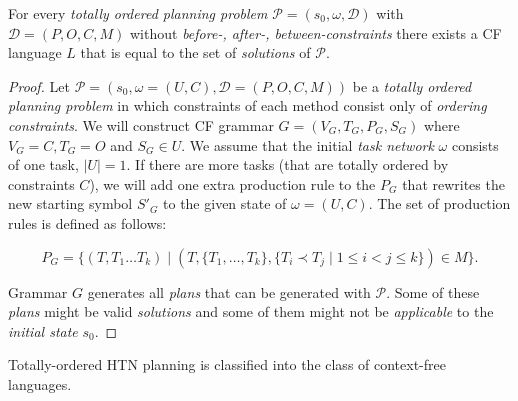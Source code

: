 \begin{thm}\label{thm02:4}
    For every \emph{totally ordered planning problem} $\mathcal{P} = (s_0,\omega,\mathcal{D})$ with $\mathcal{D}=(P, O, C, M)$ without \emph{before-, after-, between-constraints} there exists a CF language $L$ that is equal to the set of \emph{solutions} of $\mathcal{P}$.
\end{thm}
\begin{proof}
    Let $\mathcal{P} = (s_0,\omega = (U, C), \mathcal{D} = (P, O, C, M))$ be a \emph{totally ordered planning problem} in which constraints of each method consist only of \emph{ordering constraints}. We will construct CF grammar $G = (V_G, T_G, P_G, S_G)$ where $V_G = C, T_G = O$ and $S_G \in U$. We assume that the initial \emph{task network} $\omega$ consists of one task, $|U| = 1$. If there are more tasks (that are totally ordered by constraints $C$), we will add one extra production rule to the $P_G$ that rewrites the new starting symbol $S'_G$ to the given state of $\omega = (U, C)$. The set of production rules is defined as follows:
    
    \[
    P_G = \{(T, T_1\dots T_k) \; | \; (T, \{T_1, \dots, T_k\}, \{T_i \prec T_j \; | \; 1 \leq i < j \leq k\}) \in M\}.
    \]

    Grammar $G$ generates all \emph{plans} that can be generated with $\mathcal{P}$. Some of these \emph{plans} might be valid \emph{solutions} and some of them might not be \emph{applicable} to the \emph{initial state} $s_0$. 
\end{proof}

\begin{cor}\label{cor2:2}
Totally-ordered HTN planning is classified into the class of context-free languages.
\end{cor}